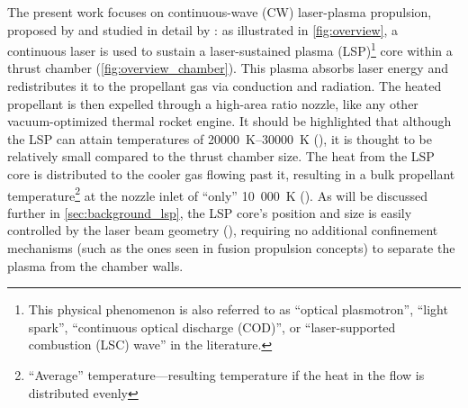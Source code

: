         The present work focuses on continuous-wave (CW) laser-plasma propulsion, proposed by \textcite{noredApplicationHighPower1976} and studied in detail by \textcite{keeferLaserSustainedPlasmas1989}: as illustrated in \autoref{fig:overview}, a continuous laser is used to sustain a laser-sustained plasma (LSP)\footnote{This physical phenomenon is also referred to as ``optical plasmotron'', ``light spark'', ``continuous optical discharge (COD)'', or ``laser-supported combustion (LSC) wave'' in the literature.} core within a thrust chamber (\autoref{fig:overview_chamber}). This plasma absorbs laser energy and redistributes it to the propellant gas via conduction and radiation. The heated propellant is then expelled through a high-area ratio nozzle, like any other vacuum-optimized thermal rocket engine. It should be highlighted that although the LSP can attain temperatures of \qtyrange{20000}{30000}{K} (\textcite{noredApplicationHighPower1976}), it is thought to be relatively small compared to the thrust chamber size. The heat from the LSP core is distributed to the cooler gas flowing past it, resulting in a bulk propellant temperature\footnote{``Average'' temperature---resulting temperature if the heat in the flow is distributed evenly} at the nozzle inlet of ``only'' 10~000~K (\textcite{duplayDesignRapidTransit2022}). As will be discussed further in \autoref{sec:background_lsp}, the LSP core's position and size is easily controlled by the laser beam geometry (\textcite{keeferLaserSustainedPlasmas1989}), requiring no additional confinement mechanisms (such as the ones seen in fusion propulsion concepts) to separate the plasma from the chamber walls. 
        
